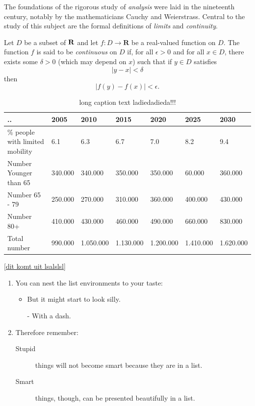 \documentclass[a4paper,12pt]{article}
\begin{document}
The foundations of the rigorous study of \emph{analysis}
were laid in the nineteenth century, notably by the
mathematicians Cauchy and Weierstrass. Central to the
study of this subject are the formal definitions of
\emph{limits} and \emph{continuity}.

Let $D$ be a subset of $\bf R$ and let
$f \colon D \to \mathbf{R}$ be a real-valued function on
$D$. The function $f$ is said to be \emph{continuous} on
$D$ if, for all $\epsilon > 0$ and for all $x \in D$,
there exists some $\delta > 0$ (which may depend on $x$)
such that if $y \in D$ satisfies
\[ |y - x| < \delta \]
then
\[ |f(y) - f(x)| < \epsilon. \]


{\renewcommand{\arraystretch}{1.5}
\renewcommand{\tabcolsep}{0.2cm}
\begin{table}[!hbp]
\caption[short]{long caption text ladiedadieda!!! \label{reffortext} }
\begin{tabular}{|l|l|l|l|l|l|l|} 
\hline 
 .. & 2005 & 2010 & 2015 & 2020 & 2025 & 2030 \\
 \hline
\% people with limited mobility  & 6.1 & 6.3 & 6.7 & 7.0 & 8.2 & 9.4 \\ 
Number Younger than 65 & 340.000 & 340.000 & 350.000 & 350.000	 & 60.000 & 360.000 \\
Number 65 - 79 & 250.000 & 270.000 & 310.000 & 360.000 & 400.000 & 430.000 \\
Number 80+ & 410.000 & 430.000 & 460.000 & 490.000 & 660.000 & 830.000 \\
\hline
Total number & 990.000 & 1.050.000 & 1.130.000 & 1.200.000 & 1.410.000 & 1.620.000\\
\hline
\end{tabular}
\ref{dit komt uit lsalslsl}
\end{table}


\flushleft
\begin{enumerate}
\item You can nest the list
environments to your taste:
\begin{itemize}
\item But it might start to
look silly.
\item[-] With a dash.
\end{itemize}
\item Therefore remember:
\begin{description}
\item[Stupid] things will not
become smart because they are
in a list.
\item[Smart] things, though,
can be presented beautifully
in a list.
\end{description}
\end{enumerate}

}
\end{document}
